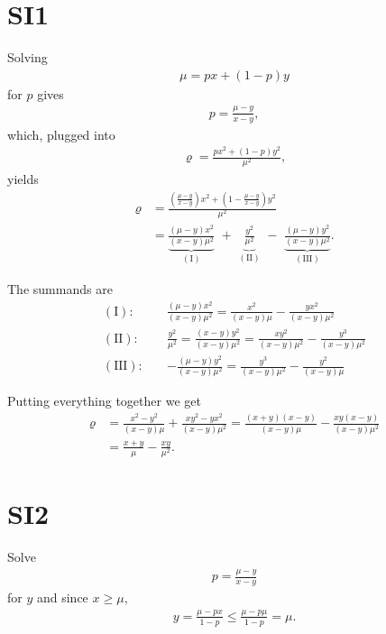 \documentclass[11pt, paper=a4]{article}
\begin{document}
\section*{SI1}

Solving
\begin{align}
\mu = px + (1-p)y
\end{align}
for $p$ gives
\begin{align}
  p = \frac{\mu-y}{x-y},
\end{align}
%
which, plugged into
\begin{align}
  \varrho = \frac{p x^2 + (1-p) y^2}{\mu^2},
\end{align}
yields
\begin{align}
  \varrho & = \frac{\left(\frac{\mu-y}{x-y}\right)x^2  + \left(1-\frac{\mu-y}{x-y}\right) y^2}{\mu^2} \\ & = \underbrace{\frac{(\mu - y)x^2}{(x-y)\mu^2}}_{\mathrm{(I)}}\,\, + \,\, \underbrace{\frac{y^2}{\mu^2}}_{\mathrm{(II)}}\,\, - \,\, \underbrace{\frac{(\mu - y)y^2}{(x-y) \mu^2}}_{\mathrm{(III)}}.
\end{align}

The summands are
\begin{align}
  \mathrm{(I):} \quad & \frac{(\mu - y)x^2}{(x-y)\mu^2} = \frac{x^2}{(x-y)\mu} - \frac{yx^2}{(x-y)\mu^2} \\
  \mathrm{(II):} \quad &  \frac{y^2}{\mu^2} = \frac{(x-y)y^2}{(x-y)\mu^2} = \frac{xy^2}{(x-y)\mu^2} - \frac{y^3}{(x-y)\mu^2} \\
  \mathrm{(III):} \quad & - \frac{(\mu - y)y^2}{(x-y) \mu^2} = \frac{y^3}{(x-y)\mu^2} - \frac{y^2}{(x-y)\mu}
\end{align}

Putting everything together we get
\begin{align}
  \varrho & =  \frac{x^2 - y^2}{(x-y)\mu} + \frac{xy^2 -yx^2}{(x-y)\mu^2}  = \frac{(x + y) (x-y)}{(x-y)\mu} - \frac{xy (x-y)}{(x-y)\mu^2} \\
  & = \frac{x+y}{\mu} - \frac{xy}{\mu^2}.
\end{align}

\section*{SI2}
Solve
\begin{align}
  p = \frac{\mu-y}{x-y}
\end{align}
for $y$ and since $x \geq \mu$,
\begin{align}
y = \frac{\mu - px}{1-p} \leq \frac{\mu - p\mu}{1-p} = \mu.
\end{align}
\end{document}
